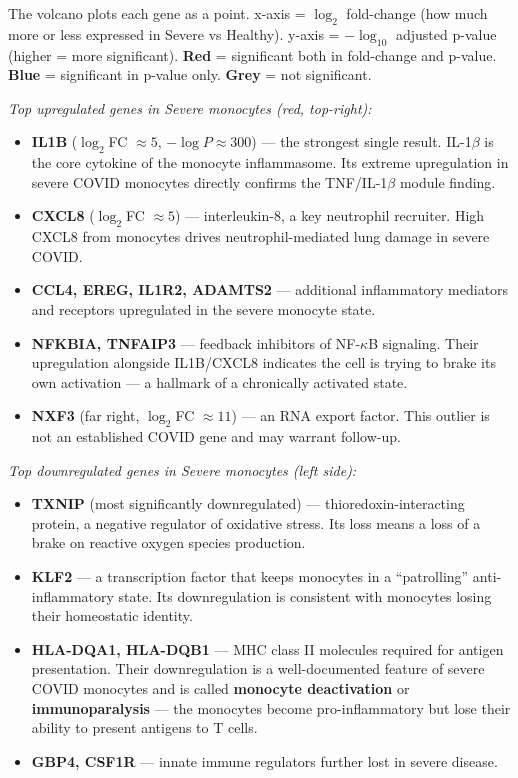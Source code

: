 \documentclass[11pt, a4paper]{article}
\begin{document}
The volcano plots each gene as a point.
x-axis = $\log_2$ fold-change (how much more or less expressed in Severe vs Healthy).
y-axis = $-\log_{10}$ adjusted p-value (higher = more significant).
\textbf{Red} = significant both in fold-change and p-value.
\textbf{Blue} = significant in p-value only. \textbf{Grey} = not significant.

\textit{Top upregulated genes in Severe monocytes (red, top-right):}
\begin{itemize}[nosep]
  \item \textbf{IL1B} ($\log_2$FC $\approx 5$, $-\log P \approx 300$) — the strongest
        single result. IL-1$\beta$ is the core cytokine of the monocyte inflammasome.
        Its extreme upregulation in severe COVID monocytes directly confirms
        the TNF/IL-1$\beta$ module finding.
  \item \textbf{CXCL8} ($\log_2$FC $\approx 5$) — interleukin-8, a key neutrophil
        recruiter. High CXCL8 from monocytes drives neutrophil-mediated lung
        damage in severe COVID.
  \item \textbf{CCL4, EREG, IL1R2, ADAMTS2} — additional inflammatory mediators
        and receptors upregulated in the severe monocyte state.
  \item \textbf{NFKBIA, TNFAIP3} — feedback inhibitors of NF-$\kappa$B signaling.
        Their upregulation alongside IL1B/CXCL8 indicates the cell is trying to
        brake its own activation — a hallmark of a chronically activated state.
  \item \textbf{NXF3} (far right, $\log_2$FC $\approx 11$) — an RNA export factor.
        This outlier is not an established COVID gene and may warrant follow-up.
\end{itemize}

\textit{Top downregulated genes in Severe monocytes (left side):}
\begin{itemize}[nosep]
  \item \textbf{TXNIP} (most significantly downregulated) — thioredoxin-interacting
        protein, a negative regulator of oxidative stress. Its loss means a loss
        of a brake on reactive oxygen species production.
  \item \textbf{KLF2} — a transcription factor that keeps monocytes in a
        ``patrolling'' anti-inflammatory state. Its downregulation is consistent
        with monocytes losing their homeostatic identity.
  \item \textbf{HLA-DQA1, HLA-DQB1} — MHC class II molecules required for
        antigen presentation. Their downregulation is a well-documented feature
        of severe COVID monocytes and is called \textbf{monocyte deactivation} or
        \textbf{immunoparalysis} — the monocytes become pro-inflammatory but lose
        their ability to present antigens to T cells.
  \item \textbf{GBP4, CSF1R} — innate immune regulators further lost in severe disease.
\end{itemize}
\end{document}
